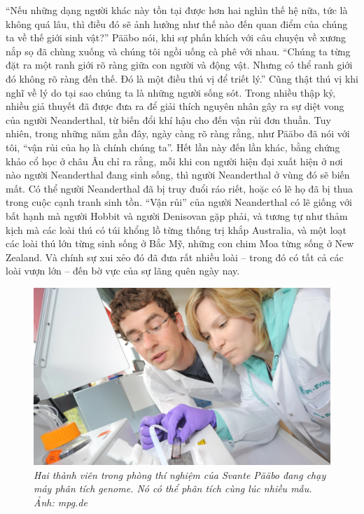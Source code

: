 \begin{multicols}{2}
	\vskip 0.1cm
	“Nếu những dạng người khác này tồn tại được hơn hai nghìn thế hệ nữa, tức là không quá lâu, thì điều đó sẽ ảnh hưởng như thế nào đến quan điểm của chúng ta về thế giới sinh vật?” Pääbo nói, khi sự phấn khích với câu chuyện về xương nắp sọ đã chùng xuống và chúng tôi ngồi uống cà phê với nhau. “Chúng ta từng đặt ra một ranh giới rõ ràng giữa con người và động vật. Nhưng có thể ranh giới đó không rõ ràng đến thế. Đó là một điều thú vị để triết lý.” Cũng thật thú vị khi nghĩ về lý do tại sao chúng ta là những người sống sót.
	\vskip 0.1cm
	Trong nhiều thập kỷ, nhiều giả thuyết đã được đưa ra để giải thích nguyên nhân gây ra sự diệt vong của người Neanderthal, từ biến đổi khí hậu cho đến vận rủi đơn thuần. Tuy nhiên, trong những năm gần đây, ngày càng rõ ràng rằng, như Pääbo đã nói với tôi, “vận rủi của họ là chính chúng ta”. Hết lần này đến lần khác, bằng chứng khảo cổ học ở châu Âu chỉ ra rằng, mỗi khi con người hiện đại xuất hiện ở nơi nào người Neanderthal đang sinh sống, thì người Neanderthal ở vùng đó sẽ biến mất. Có thể người Neanderthal đã bị truy đuổi ráo riết, hoặc có lẽ họ đã bị thua trong cuộc cạnh tranh sinh tồn. “Vận rủi” của người Neanderthal có lẽ giống với bất hạnh mà người Hobbit và người Denisovan gặp phải, và tương tự như thảm kịch mà các loài thú có túi khổng lồ từng thống trị khắp Australia, và một loạt các loài thú lớn từng sinh sống ở Bắc Mỹ, những con chim Moa từng sống ở New Zealand. Và chính sự xui xẻo đó đã đưa rất nhiều loài -- trong đó có tất cả các loài vượn lớn -- đến bờ vực của sự lãng quên ngày nay.
	\begin{figure}[H]
		\vspace*{-5pt}
		\centering
		\captionsetup{labelformat= empty, justification=centering}
		\includegraphics[width= 1\linewidth]{7}
		\caption{\small\textit{\color{timhieukhoahoc}Hai thành viên trong phòng thí nghiệm của Svante Pääbo đang chạy máy phân tích genome. Nó có thể phân tích cùng lúc nhiều mẫu. Ảnh: mpg.de}}

\end{figure}
\end{multicols}
